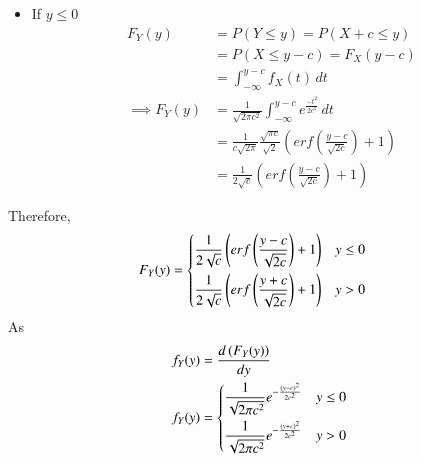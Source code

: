 \documentclass{beamer}
\begin{document}
\begin{frame}{}
\begin{itemize}
    \item If $y \leq 0$
    \begin{align}
        F_Y(y)&=P(Y\leq y)=P(X+c \leq y)\\
            &=P(X \leq y-c)=F_X(y-c)\\
            &=\int_{-\infty}^{y-c} f_X(t) \, dt \\
            \implies F_Y(y)&=\frac{1}{\sqrt{2\pi c^2}}\int_{-\infty}^{y-c}e^{\frac{-t^2}{2c^2}}\, dt\\
            &=\frac{1}{c\sqrt{2\pi}}\frac{\sqrt{\pi c}}{\sqrt{2}} \left(erf\left(\frac{y-c}{\sqrt{2c}}\right)+1\right)\\
            &=\frac{1}{2\sqrt{c}}\left(erf\left(\frac{y-c}{\sqrt{2c}}\right)+1\right)
    \end{align}
\end{itemize}

\end{frame}
\begin{frame}{}
Therefore,
\begin{align}
    F_Y(y)&=
        \begin{dcases}
        \frac{1}{2\sqrt{c}}\left(erf\left(\frac{y-c}{\sqrt{2c}}\right)+1\right) & y \leq 0 \\
        \frac{1}{2\sqrt{c}}\left(erf\left(\frac{y+c}{\sqrt{2c}}\right)+1\right) & y > 0
    \end{dcases}
\end{align}
As 
\begin{align}
    f_Y(y)&=\frac{d\left(F_Y(y)\right)}{dy}\\
    f_Y(y)&=
    \begin{dcases}
        \frac{1}{\sqrt{2\pi c^2}} e^{-\frac{(y-c)^2}{2c^2}} & y \leq 0 \\
        \frac{1}{\sqrt{2\pi c^2}} e^{-\frac{(y+c)^2}{2c^2}} & y > 0 \\
    \end{dcases}
\end{align}
\end{frame}
\end{document}
